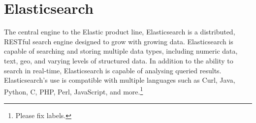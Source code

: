 \section{Elasticsearch}

The central engine to the Elastic product line, Elasticsearch is a distributed,
RESTful search engine designed to grow with growing data. Elasticsearch is
capable of searching and storing multiple data types, including numeric data,
text, geo, and varying levels of structured data. In addition to the ability to
search in real-time, Elasticsearch is capable of analysing queried
results. Elasticsearch's use is compatible with multiple languages such as Curl,
Java, Python, C, PHP, Perl, JavaScript, and more\cite{Elasticsearch}.\footnote{Please fix labels.}
